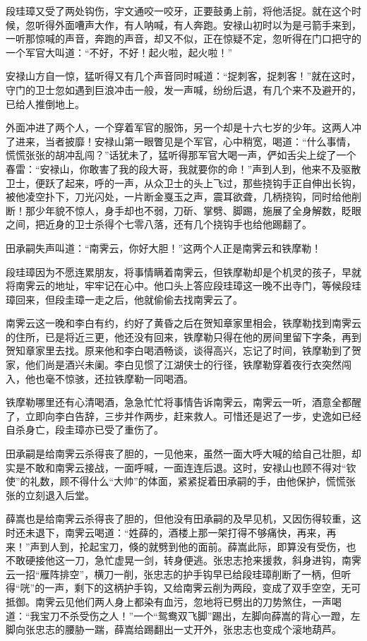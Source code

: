 \documentclass[12pt,oneside]{book}
\begin{document}
段珪璋又受了两处钩伤，宇文通咬一咬牙，正要鼓勇上前，将他活捉。就在这个时候，忽听得外面嘈声大作，有人呐喊，有人奔跑。安禄山初时以为是弓箭手来到，一听那惊喊的声音，奔跑的声音，却又不似，正在惊疑不定，忽听得在门口把守的一个军官大叫道：``不好，不好！起火啦，起火啦！''

安禄山方自一惊，猛听得又有几个声音同时喊道：``捉刺客，捉刺客！''就在这时，守门的卫士忽如遇到巨浪冲击一般，发一声喊，纷纷后退，有几个来不及避开的，已给人推倒地上。

外面冲进了两个人，一个穿着军官的服饰，另一个却是十六七岁的少年。这两人冲了进来，当者披靡！安禄山第一眼瞥见是个军官，心中稍宽，喝道：``什么事情，慌慌张张的胡冲乱闯？''话犹未了，猛听得那军官大喝一声，俨如舌尖上绽了一个春雷：``安禄山，你敢害了我的段大哥，我就要你的命！''声到人到，他来不及驱散卫士，便跃了起来，呼的一声，从众卫士的头上飞过，那些挠钩手正自伸出长钩，被他凌空扑下，刀光闪处，一片断金戛玉之声，震耳欲聋，几柄挠钩，同时给他削断！那少年貌不惊人，身手却也不弱，刀斫、掌劈、脚踢，施展了全身解数，眨眼之间，把近身的卫士杀得个七零八落，还有几个挠钩手也给他踢翻了。

田承嗣失声叫道：``南霁云，你好大胆！''这两个人正是南霁云和铁摩勒！

段珪璋因为不愿连累朋友，将事情瞒着南霁云，但铁摩勒却是个机灵的孩子，早就将南霁云的地址，牢牢记在心中。他口头上答应段珪璋这一晚不出寺门，等候段珪璋回来，但段圭璋一走之后，他就偷偷去找南霁云了。

南霁云这一晚和李白有约，约好了黄昏之后在贺知章家里相会，铁摩勒找到南霁云的住所，已是将近三更，他还没有回来，铁摩勒只得在他的房间里留下字条，再到贺知章家里去找。原来他和李白喝酒畅谈，谈得高兴，忘记了时间，铁摩勒到了贺家，他们尚是酒兴未阑。李白见惯了江湖侠士的行径，铁摩勒穿着夜行衣突然闯入，他也毫不惊骇，还拉铁摩勒一同喝酒。

铁摩勒哪里还有心清喝酒，急急忙忙将事情告诉南霁云，南霁云一听，酒意全都醒了，立即向李白告辞，三步并作两步，赶来救人。可惜还是迟了一步，史逸如已经自杀身亡，段圭璋亦已受了重伤了。

田承嗣是给南霁云杀得丧了胆的，一见他来，虽然一面大呼大喊的给自己壮胆，却实是不敢和南霁云接战，一面呼喊，一面连连后退。这时，安禄山也顾不得对``钦使''的礼数，顾不得什么``大帅''的体面，紧紧捉着田承嗣的手，由他保护，慌慌张张的立刻退入后堂。

薛嵩也是给南霁云杀得丧了胆的，但他没有田承嗣的及早见机，又因伤得较重，这时还未退下，南霁云喝道：``姓薛的，酒楼上那一架打得不够痛快，再来，再来！''声到人到，抡起宝刀，倏的就劈到他的面前。薛嵩此际，即算没有受伤，也不敢硬接他这一刀，急忙虚晃一剑，转身便逃。张忠志抢来援救，斜身进钩，南霁云一招``雁阵排空''，横刀一削，张忠志的护手钩早已给段珪璋削断了一柄，但听得``咣''的一声，剩下的这柄护手钩，又给南霁云削为两段，变成了双手空空，无可抵御。南霁云见他们两人身上都染有血污，忽地将已劈出的刀势煞住，一声喝道：``我宝刀不杀受伤之人！''一个``鸳鸯双飞脚''踢出，左脚向薛嵩的背心一蹬，左脚向张忠志的腰胁一踹，薛嵩给踢翻出一丈开外，张忠志也变成个滚地葫芦。
\end{document}
